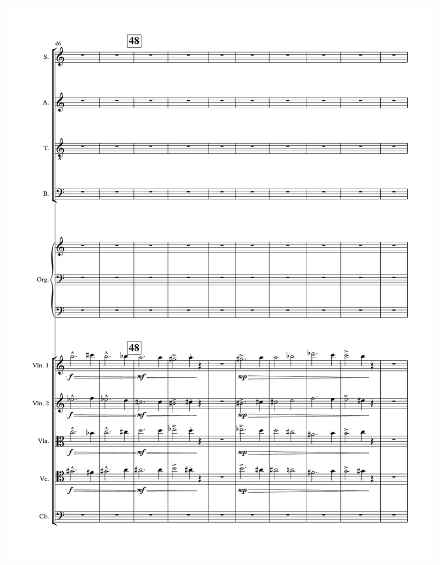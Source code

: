 \begin{figure}[htbp]
    \centering
	\includegraphics[width=6.5in]{figures/Stabat_Mater_11.pdf}
\end{figure}

